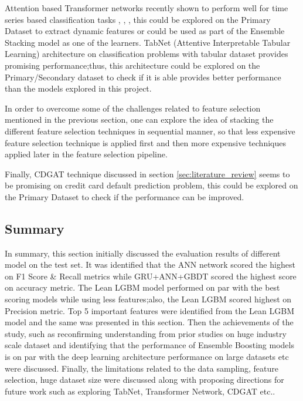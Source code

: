 \documentclass[twoside,11pt,a4paper]{article}
\begin{document}
Attention based Transformer networks recently shown to perform well for time series based classification tasks \citep{wen2022transformers}, \citep{lim2021temporal}, \citep{cholakov2021transformers}, this could be explored on the Primary Dataset to extract dynamic features or could be used as part of the Ensemble Stacking model as one of the learners. TabNet (Attentive Interpretable Tabular Learning)\citep{arik2021tabnet} architecture on classification problems with tabular dataset provides promising performance;thus, this architecture could be explored on the Primary/Secondary dataset to check if it is able  provides better performance than the models explored in this project.

In order to overcome some of the challenges related to feature selection mentioned in the previous section, one can explore the idea of stacking the different feature selection techniques in sequential manner, so that less expensive feature selection technique is applied first and then more expensive techniques applied later in the feature selection pipeline.

Finally, \acf{CDGAT} \citep{wu2022cdgat} technique discussed in section \ref{sec:literature_review} seems to be promising on credit card default prediction problem, this could be explored on the Primary Dataset to check if the performance can be improved.


\subsection{Summary}
In summary, this section initially discussed the evaluation results of different model on the test set. It was identified that the \acs{ANN} network scored the highest on F1 Score \& Recall metrics while \acs{GRU}+\acs{ANN}+\acs{GBDT} scored the highest score on accuracy metric. The Lean \acs{LGBM} model performed on par with the best scoring models while using less features;also, the Lean \acs{LGBM} scored highest on Precision metric. Top 5 important features were identified from the Lean \acs{LGBM} model and the same was presented in this section.
Then the achievements of the study, such as reconfirming understanding from prior studies on huge industry scale dataset and identifying that the performance of Ensemble Boosting models is on par with the deep learning architecture performance on large datasets etc were discussed.
Finally, the limitations related to the data sampling, feature selection, huge dataset size were discussed along with proposing directions for future work such as exploring TabNet, Transformer Network, \acs{CDGAT} etc..
\vfill
\clearpage
\end{document}
